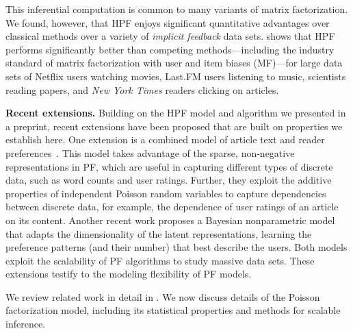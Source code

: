 

This inferential computation is common to many variants of matrix
factorization.  We found, however, that HPF enjoys significant
quantitative advantages over classical methods over a variety of
\emph{implicit feedback} data sets.  shows
that HPF performs significantly better than competing
methods---including the industry standard of matrix factorization with
user and item biases (MF)---for large data sets of Netflix users
watching movies, Last.FM users listening to music, scientists reading
papers, and \textit{New York Times} readers clicking on articles.


{\bf Recent extensions.}  
Building on the HPF model and algorithm we presented in a preprint,
recent extensions have been proposed that are built on properties we
establish here. One extension is a combined model of article text and
reader preferences~\cite{gopalan2014content}. This model takes
advantage of the sparse, non-negative representations in PF, which are
useful in capturing different types of discrete data, such as word
counts and user ratings. Further, they exploit the additive properties
of independent Poisson random variables to capture dependencies
between discrete data, for example, the dependence of user ratings of
an article on its content. Another recent work proposes a Bayesian
nonparametric model~\cite{gopalan2014bayesian} that adapts the
dimensionality of the latent representations, learning the preference
patterns (and their number) that best describe the users. Both models
exploit the scalability of PF algorithms to study massive data sets.
These extensions testify to the modeling flexibility of PF models.

We review related work in detail in . We now discuss
details of the Poisson factorization model, including its statistical
properties and methods for scalable inference.




